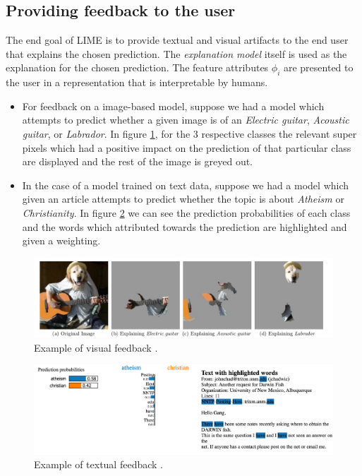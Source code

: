 \subsection{Providing feedback to the user}
The end goal of LIME is to provide textual and visual artifacts to the end user that explains the chosen prediction. The \emph{explanation model} itself is used as the explanation for the chosen prediction. The feature attributes $\phi_{i}$ are presented to the user in a representation that is interpretable by humans.
\begin{itemize}
\item For  feedback on a image-based model, suppose we had a model which attempts to predict whether a given image is of an \emph{Electric guitar}, \emph{Acoustic guitar}, or \emph{Labrador}. In figure \ref{fig:lime-visual-feedback}, for the 3 respective classes the relevant super pixels which had a positive impact on the prediction of that particular class are displayed and the rest of the image is greyed out.
\item In the case of a model trained on text data, suppose we had a model which given an article attempts to predict whether the topic is about \emph{Atheism} or \emph{Christianity}. In figure \ref{fig:lime-textual-feedback} we can see the prediction probabilities of each class and the words which attributed towards the prediction are highlighted and given a weighting.
\end{itemize}

\begin  {figure}[!htpb]
  \includegraphics[width=\linewidth]{Evaluation_Images/Lime_visual_representation.jpg}
  \caption{Example of visual feedback \cite{lime}. }
  \label{fig:lime-visual-feedback}
\end{figure}

\begin  {figure}[!htpb]
  \includegraphics[width=\linewidth]{Evaluation_Images/Lime_text_represntation.png}
  \caption{Example of textual feedback \cite{Https://github.com/marcotcr/lime}.}
  \label{fig:lime-textual-feedback}
\end{figure}

